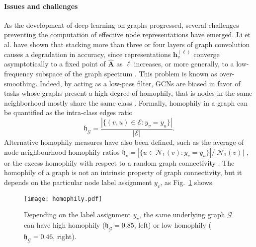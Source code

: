 \documentclass[final,5p,times,twocolumn]{elsarticle}
\begin{document}
\paragraph{Issues and challenges}

As the development of deep learning on graphs progressed, several challenges preventing the computation of effective node representations have emerged.
Li et al. \cite{Li2018} have shown that stacking more than three or four layers of graph convolution causes a degradation in accuracy, since representations $\mathbf{h}_v^{(\ell)}$ converge asymptotically to a fixed point of $\mathbf{\hat{A}}$ as $\ell$ increases, or more generally, to a low-frequency subspace of the graph spectrum \cite{Oono2020}.
This problem is known as over-smoothing.
Indeed, by acting as a low-pass filter, GCNs are biased in favor of tasks whose graphs present a high degree of homophily, that is nodes in the same neighborhood mostly share the same class \citep{Zhu2020}.
Formally, homophily in a graph can be quantified as the intra-class edges ratio
\begin{equation}\label{eq:homophily}
	\mathfrak{h}_\mathcal{G} = \frac{\left|\{(v, u) \in \mathcal{E} : y_v = y_u\}\right|}{\left|\mathcal{E}\right|}.
\end{equation}
Alternative homophily measures have also been defined, such as the average of node neighbourhood homophily ratios $\mathfrak{h}_v = |\{ u \in \mathcal{N}_1(v) : y_v = y_u \}| / |\mathcal{N}_1(v)|$ \cite{Pei2020}, or the excess homophily with respect to a random graph connectivity \cite{Lim2021}.
The homophily of a graph is not an intrinsic property of graph connectivity, but it depends on the particular node label assignment $y_v$, as Fig.~\ref{fig:homophily} shows.

\begin{figure}
\centering
\texttt{[image: homophily.pdf]}
\caption{Depending on the label assignment $y_v$, the same underlying graph $\mathcal{G}$ can have high homophily ($\mathfrak{h}_\mathcal{G} = 0.85$, left) or low homophily ($\mathfrak{h}_\mathcal{G} = 0.46$, right).}
\label{fig:homophily}
\end{figure}
\end{document}
